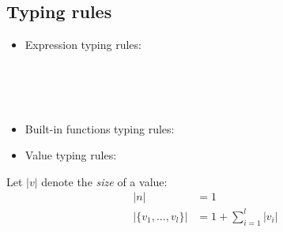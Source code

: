 \subsection{Typing rules}
\begin{itemize}
	
	\item Expression typing rules:\\
	
	
	\\[2ex]
	
	
	\\[2ex]
	
	\\[2ex]
	
	
\item  Built-in functions typing rules:\\

	
	\PT{\Axiom{\Typef{\iotan}{\int} {\tseq{\int}}}}
	\PT{\Axiom{\Typef{\plusn}{\int,\int} {\int}}}
	
	\item Value typing rules: \\
	
	
	
\end{itemize}

\begin{nota}
Let $|v|$ denote the \emph{size} of a value:
\begin{align*}
	|n| & = 1 \\
	|\{v_1,...,v_l\}| & = 1 + \sum_{i=1}^{l}|v_i|
\end{align*}

\end{nota}

